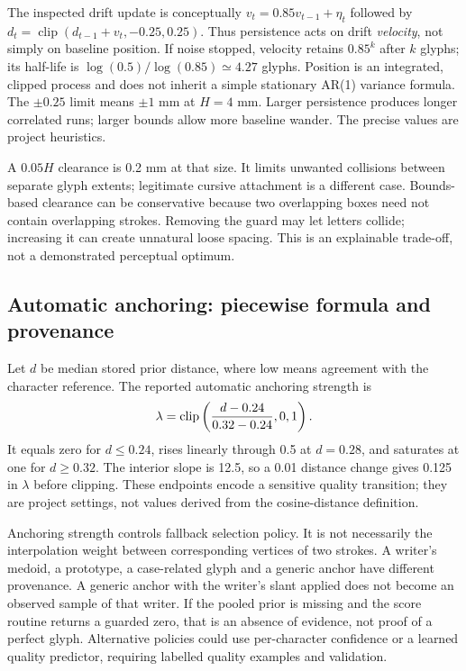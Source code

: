 The inspected drift update is conceptually
$v_t=0.85v_{t-1}+\eta_t$ followed by
$d_t=\operatorname{clip}(d_{t-1}+v_t,-0.25,0.25)$.
Thus persistence acts on drift \emph{velocity}, not simply on baseline
position. If noise stopped, velocity retains $0.85^k$ after $k$ glyphs;
its half-life is $\log(0.5)/\log(0.85)\simeq4.27$ glyphs.
Position is an integrated, clipped process and does not inherit a simple
stationary AR(1) variance formula. The $\pm0.25$ limit means $\pm1$ mm
at $H=4$ mm. Larger persistence produces longer correlated runs; larger
bounds allow more baseline wander. The precise values are project heuristics.

A $0.05H$ clearance is 0.2 mm at that size. It limits unwanted collisions
between separate glyph extents; legitimate cursive attachment is a different
case. Bounds-based clearance can be conservative because two overlapping
boxes need not contain overlapping strokes. Removing the guard may let
letters collide; increasing it can create unnatural loose spacing. This is
an explainable trade-off, not a demonstrated perceptual optimum.

\subsection{Automatic anchoring: piecewise formula and provenance}
Let $d$ be median stored prior distance, where low means agreement with
the character reference. The reported automatic anchoring strength is
\[
\lambda=\operatorname{clip}\left({d-0.24\over0.32-0.24},0,1\right).
\]
It equals zero for $d\le0.24$, rises linearly through 0.5 at $d=0.28$,
and saturates at one for $d\ge0.32$. The interior slope is 12.5, so a
0.01 distance change gives 0.125 in $\lambda$ before clipping. These endpoints
encode a sensitive quality transition; they are project settings, not values
derived from the cosine-distance definition.

Anchoring strength controls fallback selection policy. It is not necessarily
the interpolation weight between corresponding vertices of two strokes.
A writer's medoid, a prototype, a case-related glyph and a generic anchor
have different provenance. A generic anchor with the writer's slant applied
does not become an observed sample of that writer. If the pooled prior is
missing and the score routine returns a guarded zero, that is an absence of
evidence, not proof of a perfect glyph. Alternative policies could use
per-character confidence or a learned quality predictor, requiring labelled
quality examples and validation.


